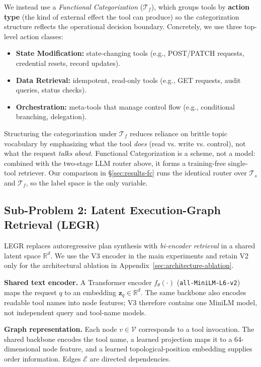 \documentclass{article}
\begin{document}
We instead use a \textit{Functional Categorization} ($\mathcal{T}_f$), which groups tools by \textbf{action type} (the kind of external effect the tool can produce) so the categorization structure reflects the operational decision boundary. Concretely, we use three top-level action classes:
\begin{itemize}
    \item \textbf{State Modification:} state-changing tools (e.g., POST/PATCH requests, credential resets, record updates).
    \item \textbf{Data Retrieval:} idempotent, read-only tools (e.g., GET requests, audit queries, status checks).
    \item \textbf{Orchestration:} meta-tools that manage control flow (e.g., conditional branching, delegation).
\end{itemize}
Structuring the categorization under $\mathcal{T}_f$ reduces reliance on brittle topic vocabulary by emphasizing what the tool \emph{does} (read vs. write vs. control), not what the request \emph{talks about}. Functional Categorization is a scheme, not a model: combined with the two-stage LLM router above, it forms a training-free single-tool retriever. Our comparison in \S\ref{sec:results-fc} runs the identical router over $\mathcal{T}_s$ and $\mathcal{T}_f$, so the label space is the only variable.

\subsection{Sub-Problem 2: Latent Execution-Graph Retrieval (LEGR)}
\label{sec:legr}
LEGR replaces autoregressive plan synthesis with \emph{bi-encoder retrieval} in a shared latent space $\mathbb{R}^d$. We use the V3 encoder in the main experiments and retain V2 only for the architectural ablation in Appendix~\ref{sec:architecture-ablation}.

\textbf{Shared text encoder.} A Transformer encoder $f_\theta(\cdot)$ (\texttt{all-MiniLM-L6-v2}) maps the request $q$ to an embedding $\mathbf{z}_q \in \mathbb{R}^d$. The same backbone also encodes readable tool names into node features; V3 therefore contains one MiniLM model, not independent query and tool-name models.

\textbf{Graph representation.} Each node $v\in\mathcal{V}$ corresponds to a tool invocation. The shared backbone encodes the tool name, a learned projection maps it to a 64-dimensional node feature, and a learned topological-position embedding supplies order information. Edges $\mathcal{E}$ are directed dependencies.
\end{document}
